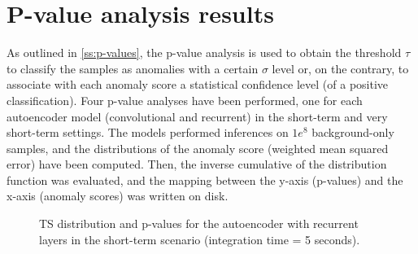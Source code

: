 \FloatBarrier
\section{P-value analysis results}
\label{s:p-values-results}
As outlined in \autoref{ss:p-values}, the p-value analysis is used to obtain the threshold $\tau$ to classify the samples as anomalies with a certain $\sigma$ level or, on the contrary, to associate with each anomaly score a statistical confidence level (of a positive classification). Four p-value analyses have been performed, one for each autoencoder model (convolutional and recurrent) in the short-term and very short-term settings. The models performed inferences on $1e^8$ background-only samples, and the distributions of the anomaly score (weighted mean squared error) have been computed. Then, the inverse cumulative of the distribution function was evaluated, and the mapping between the y-axis (p-values) and the x-axis (anomaly scores) was written on disk. 
\begin{figure}[!htb]
    \centering
    \begin{minipage}{0.5\textwidth}
        \centering
        
    \end{minipage}%
    \begin{minipage}{0.5\textwidth}
       \centering
       
    \end{minipage}
    \captionsetup{width=0.9\linewidth}
    \caption{TS distribution and p-values for the autoencoder with recurrent layers in the short-term scenario (integration time = 5 seconds).}
    \label{fig:ts-distribution-and-p-values-rnn-it-5}
\end{figure}

